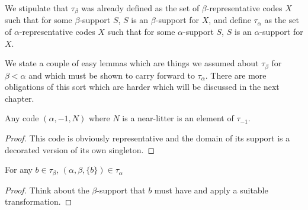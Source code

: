 \begin{definition}
\label {def:tau-alpha}



We stipulate that $\tau_\beta$ was already defined as the set of $\beta$-representative codes $X$ such that for some $\beta$-support $S$,
$S$ is an $\beta$-support for $X$,  and define $\tau_\alpha$ as the set of $\alpha$-representative codes $X$ such that for some $\alpha$-support $S$,
$S$ is an $\alpha$-support for $X$.

\end{definition}

We state a couple of easy lemmas which are things we assumed about $\tau_\beta$ for $\beta<\alpha$ and which must be shown to carry forward to $\tau_\alpha$.  There are more obligations of this sort which are harder which will be discussed in the next chapter.

\begin{lemma}

Any code $(\alpha,-1,N)$ where $N$ is a near-litter is an element of $\tau_{-1}$.

\end{lemma}

\begin{proof}

This code is obviously representative and the domain of its support is a decorated version of its own singleton.

\end{proof}

\begin{lemma}
\label {def:singleton-obligation}

For any $b \in \tau_\beta$, $(\alpha,\beta,\{b\}) \in \tau_\alpha$

\end{lemma}

\begin{proof}

Think about the $\beta$-support that $b$ must have and apply a suitable transformation.

\end{proof}


